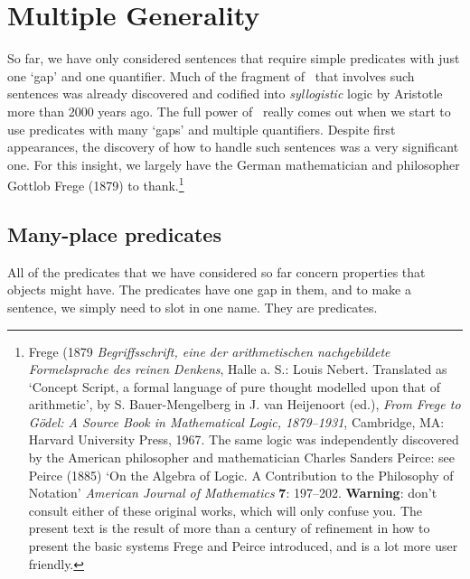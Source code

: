 \chapter{Multiple Generality}\label{s:MultipleGenerality}
So far, we have only considered sentences that require simple predicates with just one `gap' and one quantifier. Much of the fragment of \FOL\ that involves such sentences was already discovered and codified into \emph{syllogistic} logic by Aristotle more than 2000 years ago. The full power of \FOL\ really comes out when we start to use predicates with many `gaps' and multiple quantifiers. Despite first appearances, the discovery of how to handle such sentences was a very significant one.  For this insight, we largely have the German mathematician and philosopher Gottlob Frege (1879) to thank.\footnote{Frege (1879 \emph{Begriffsschrift, eine der arithmetischen nachgebildete Formelsprache des reinen Denkens}, Halle a. S.: Louis Nebert. Translated as `Concept Script, a formal language of pure thought modelled upon that of arithmetic', by S. Bauer-Mengelberg in J. van Heijenoort (ed.), \emph{From Frege to Gödel: A Source Book in Mathematical Logic, 1879–1931}, Cambridge, MA: Harvard University Press, 1967. The same logic was independently discovered by the American philosopher and mathematician Charles Sanders Peirce: see Peirce (1885) `On the Algebra of Logic. A Contribution to the Philosophy of Notation' \emph{American Journal of Mathematics} \textbf{7}: 197–202. \textbf{Warning}: don't consult either of these original works, which will only confuse you. The present text is the result of more than a century of refinement in how to present the basic systems Frege and Peirce introduced, and is a lot more user friendly.}


\section{Many-place predicates}
All of the predicates that we have considered so far concern properties that objects might have. The predicates have one gap in them, and to make a sentence, we simply need to slot in one name. They are  predicates.

